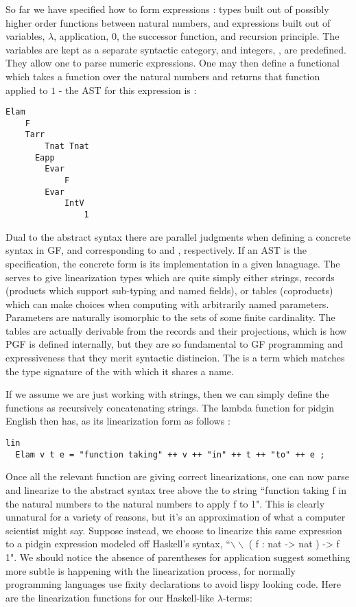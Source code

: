 So far we have specified how to form expressions : types built out of possibly
higher order functions between natural numbers, and expressions built out of
variables, $\lambda$, application, $0$, the successor function, and recursion
principle. The variables are kept as a separate syntactic category, and
integers, , are predefined. They allow one to
parse numeric expressions. One may then define a functional which takes a
function over the natural numbers and returns that function applied to $1$ - the
AST for this expression is :

\begin{verbatim} 
Elam
    F
    Tarr
        Tnat Tnat
      Eapp
        Evar
            F
        Evar
            IntV
                1
\end{verbatim} 

Dual to the abstract syntax there are parallel judgments when defining a
concrete syntax in GF,  and  corresponding to 
and , respectively. If an AST is the specification, the concrete form
is its implementation in a given lanaguage. The  serves to give
linearization types which are quite simply either strings, records (products
which support sub-typing and named fields), or tables (coproducts) which can
make choices when computing with arbitrarily named parameters. Parameters are
naturally isomorphic to the sets of some finite cardinality. The tables are
actually derivable from the records and their projections, which is how PGF is
defined internally, but they are so fundamental to GF programming and
expressiveness that they merit syntactic distincion. The  is a term
which matches the type signature of the  with which it shares a name.

If we assume we are just working with strings, then we can simply define the
functions as recursively concatenating \codeword{++} strings. The lambda function
for pidgin English then has, as its linearization form as follows :

\begin{verbatim}
lin 
  Elam v t e = "function taking" ++ v ++ "in" ++ t ++ "to" ++ e ;
\end{verbatim}

Once all the relevant function are giving correct linearizations, one can now
parse and linearize to the abstract syntax tree above the to string ``function
taking f in the natural numbers to the natural numbers to apply f to 1". This is
clearly unnatural for a variety of reasons, but it's an approximation of what
a computer scientist might say. Suppose instead, we choose to linearize this same
expression to a pidgin expression modeled off Haskell's syntax,
``$\backslash\backslash$ ( f : nat -> nat ) -> f 1". We should notice the absence of parentheses for
application suggest something more subtle is happening with the linearization
process, for normally programming languages use fixity declarations to avoid
lispy looking code. Here are the linearization functions for our Haskell-like
$\lambda$-terms:

